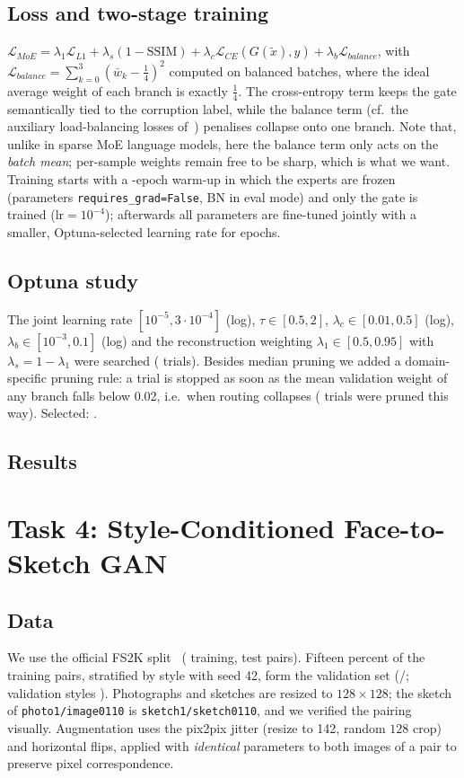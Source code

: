 \documentclass[conference]{IEEEtran}
\begin{document}
\subsection{Loss and two-stage training}
$\mathcal{L}_{MoE}=\lambda_1\mathcal{L}_{L1}+\lambda_s(1-\text{SSIM})+\lambda_c\mathcal{L}_{CE}(G(\tilde{x}),y)+\lambda_b\mathcal{L}_{balance}$, with $\mathcal{L}_{balance}=\sum_{k=0}^{3}(\bar{w}_k-\tfrac14)^2$ computed on balanced batches, where the ideal average weight of each branch is exactly $\tfrac14$. The cross-entropy term keeps the gate semantically tied to the corruption label, while the balance term (cf.\ the auxiliary load-balancing losses of~\cite{shazeer2017,fedus2021switch}) penalises collapse onto one branch. Note that, unlike in sparse MoE language models, here the balance term only acts on the \emph{batch mean}; per-sample weights remain free to be sharp, which is what we want. Training starts with a \MOEWARM-epoch warm-up in which the experts are frozen (parameters \texttt{requires\_grad=False}, BN in eval mode) and only the gate is trained ($\text{lr}=10^{-4}$); afterwards all parameters are fine-tuned jointly with a smaller, Optuna-selected learning rate for \MOEEPOCHS{} epochs.

\subsection{Optuna study}
The joint learning rate $[10^{-5},3\cdot10^{-4}]$ (log), $\tau\in[0.5,2]$, $\lambda_c\in[0.01,0.5]$ (log), $\lambda_b\in[10^{-3},0.1]$ (log) and the reconstruction weighting $\lambda_1\in[0.5,0.95]$ with $\lambda_s=1-\lambda_1$ were searched (\MOETRIALS{} trials). Besides median pruning we added a domain-specific pruning rule: a trial is stopped as soon as the mean validation weight of any branch falls below 0.02, i.e.\ when routing collapses (\MOECOLLAPSED{} trials were pruned this way). Selected: \MOEBESTPARAMS.

\subsection{Results}


\section{Task 4: Style-Conditioned Face-to-Sketch GAN}
\subsection{Data}
We use the official FS2K split~\cite{fan2022fs2k} (\FSTRAINFULL{} training, \FSTEST{} test pairs). Fifteen percent of the training pairs, stratified by style with seed 42, form the validation set (\FSTRAIN/\FSVAL; validation styles \FSVALSTYLES). Photographs and sketches are resized to $128\times128$; the sketch of \texttt{photo1/image0110} is \texttt{sketch1/sketch0110}, and we verified the pairing visually. Augmentation uses the pix2pix jitter (resize to 142, random $128$ crop) and horizontal flips, applied with \emph{identical} parameters to both images of a pair to preserve pixel correspondence.
\end{document}
